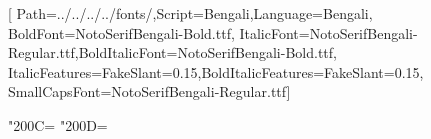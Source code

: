 \newcommand*{\ollangid}{bn}
\newcommand*{\ollanguage}{bengali}
\usepackage{fontspec}
\setmainfont{Latin Modern Roman}
\setsansfont{Latin Modern Sans}
\setmonofont{Latin Modern Mono}
\newfontfamily{}
\newfontfamily{}[
  Path=../../../../fonts/,Script=Bengali,Language=Bengali,
  BoldFont=NotoSerifBengali-Bold.ttf,
  ItalicFont=NotoSerifBengali-Regular.ttf,BoldItalicFont=NotoSerifBengali-Bold.ttf,
  ItalicFeatures={FakeSlant=0.15},BoldItalicFeatures={FakeSlant=0.15},
  SmallCapsFont=NotoSerifBengali-Regular.ttf]
\usepackage[Bengali,DevanagariDanDa,BasicLatin,GeneralPunctuation]{ucharclasses}
\XeTeXcharclass"200C=\BengaliClass
\XeTeXcharclass"200D=\BengaliClass
{}
\usepackage[nonumberlist,toc,style=index]{glossaries}
\makeglossaries
